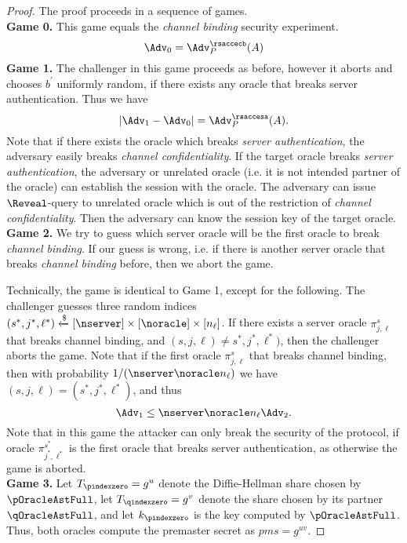 \begin{proof}
 The proof proceeds in a sequence of games. \vspace{10pt}\\
 \textbf{Game 0.} This game equals the \textit{channel binding} security experiment.
 \begin{equation}
  \Adv_0 = \Adv^{\rsaccecb}_{P}(A)
 \end{equation}%
%
%
 \textbf{Game 1.} The challenger in this game proceeds as before, however it aborts and chooses $b^{\prime}$ uniformly random, if there exists any oracle that breaks server authentication. Thus we have
 \begin{equation}
  |\Adv_1 - \Adv_0| = \Adv^{\rsaccesa}_{P}(A).
 \end{equation}%
 Note that if there exists the oracle which breaks \textit{server authentication}, the adversary easily breaks \textit{channel confidentiality}. If the target oracle breaks \textit{server authentication}, the adversary or unrelated oracle (i.e. it is not intended partner of the oracle) can establish the session with the oracle. The adversary can issue $\Reveal$-query to unrelated oracle which is out of the restriction of \textit{channel confidentiality}. Then the adversary can know the session key of the target oracle.
\vspace{10pt}\\%
%
%
 \textbf{Game 2.} We try to guess which server oracle will be the first oracle to break \textit{channel binding}. If our guess is wrong, i.e. if there is another server oracle that breaks \textit{channel binding} before, then we abort the game.

 Technically, the game is identical to Game 1, except for the following. The challenger guesses three random indices $(s^{\ast}, j^{\ast}, \ell^{\ast}) \xleftarrow{\$} [\nserver] \times [\noracle] \times [n_{\ell}]$. If there exists a server oracle $\pi^s_{j,\ell}$ that breaks channel binding, and $(s, j, \ell) \neq s^{\ast}, j^{\ast}, \ell^{\ast})$, then the challenger aborts the game. Note that if the first oracle $\pi^s_{j,\ell}$ that breaks channel binding, then with probability $1/(\nserver \noracle n_{\ell})$ we have $(s,j,\ell) = (s^{\ast}, j^{\ast}, \ell^{\ast})$, and thus
 \begin{equation}
  \Adv_1 \leq \nserver \noracle n_{\ell} \Adv_2.
 \end{equation}%
 Note that in this game the attacker can only break the security of the protocol, if oracle $\pi^{s^{\ast}}_{j^{\ast},\ell^{\ast}}$ is the first oracle that breaks server authentication, as otherwise the game is aborted.
\vspace{10pt}\\%
%
%
 \textbf{Game 3.} Let $T_{\pindexzero} = g^u$ denote the Diffie-Hellman share chosen by $\pOracleAstFull$, let $T_{\qindexzero} = g^v$ denote the share chosen by its partner $\qOracleAstFull$, and let $k_{\pindexzero}$ is the key computed by $\pOracleAstFull$. Thus, both oracles compute the premaster secret as $pms = g^{uv}$.


\end{proof}
